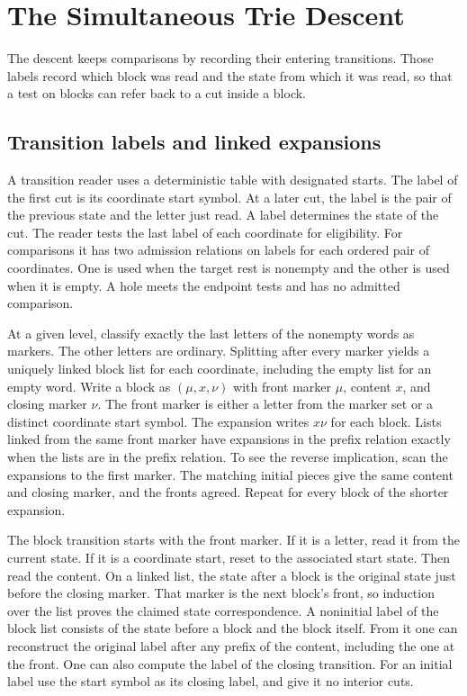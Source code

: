 \section{The Simultaneous Trie Descent}
\label{app:trie}

The descent keeps comparisons by recording their entering transitions.
Those labels record which block was read and the state from which it
was read, so that a test on blocks can refer back to a cut inside a
block.

\subsection{Transition labels and linked expansions}

A transition reader uses a deterministic table with designated starts.
The label of the first cut is its coordinate start symbol. At a later
cut, the label is the pair of the previous state and the letter just
read. A label determines the state of the cut. The reader tests the
last label of each coordinate for eligibility. For comparisons it has
two admission relations on labels for each ordered pair of coordinates.
One is used when the target rest is nonempty and the other is used
when it is empty. A hole meets the endpoint tests and has no admitted
comparison.

At a given level, classify exactly the last letters of the nonempty
words as markers. The other letters are ordinary. Splitting after every
marker yields a uniquely linked block list for each coordinate, including
the empty list for an empty word. Write a block as $(\mu,x,\nu)$ with front
marker $\mu$, content $x$, and closing marker $\nu$. The front marker is
either a letter from the marker set or a distinct coordinate start
symbol. The expansion writes $x\nu$ for each block. Lists linked from
the same front marker have expansions in the prefix relation exactly
when the lists are in the prefix relation. To see the reverse
implication, scan the expansions to the first marker. The matching
initial pieces give the same content and closing marker, and the
fronts agreed. Repeat for every block of the shorter expansion.

The block transition starts with the front marker. If it is a letter,
read it from the current state. If it is a coordinate start, reset
to the associated start state. Then read the content. On a linked
list, the state after a block is the original state just before the
closing marker. That marker is the next block's front, so induction
over the list proves the claimed state correspondence. A noninitial
label of the block list consists of the state before a block and
the block itself. From it one can reconstruct the original label
after any prefix of the content, including the one at the front.
One can also compute the label of the closing transition. For an
initial label use the start symbol as its closing label, and give
it no interior cuts.

